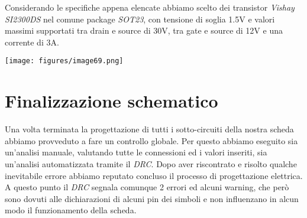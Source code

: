 \noindent Considerando le specifiche appena elencate abbiamo scelto dei transistor
\textit{Vishay SI2300DS} nel comune package \textit{SOT23}, con tensione di soglia 1.5V e
valori massimi supportati tra drain e source di 30V, tra gate e source
di 12V e una corrente di 3A.

\begin{center}
\texttt{[image: figures/image69.png]}
\captionsetup{type=figure}
\end{center}

\hypertarget{finalizzazione schematico}{%
\section{Finalizzazione schematico}\label{finalizzazione schematico}}

Una volta terminata la progettazione di tutti i sotto-circuiti della 
nostra scheda abbiamo provveduto a fare un controllo globale. Per questo abbiamo eseguito 
sia un’analisi manuale, valutando tutte le connessioni ed i valori inseriti, sia un’analisi 
automatizzata tramite il \textit{DRC}. Dopo aver riscontrato e risolto qualche inevitabile errore 
abbiamo reputato concluso il processo di progettazione elettrica. A questo punto il \textit{DRC} 
segnala comunque 2 errori ed alcuni warning, che però sono dovuti alle dichiarazioni di alcuni 
pin dei simboli e non influenzano in alcun modo il funzionamento della scheda.
